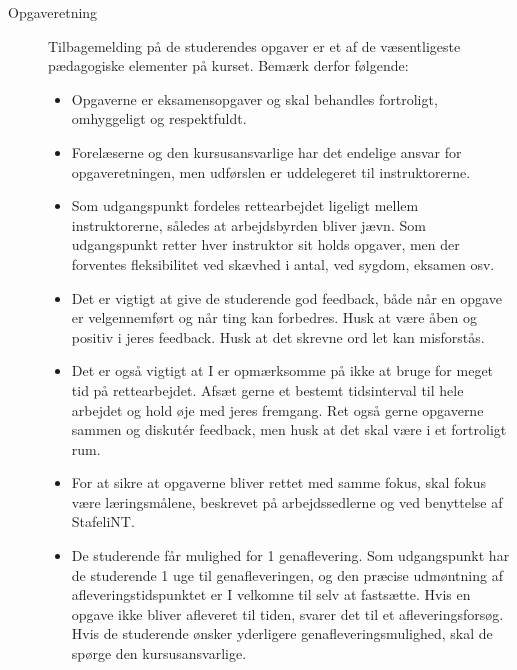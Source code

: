 \documentclass[a4paper]{article}
\begin{document}
\begin{description}
\item[Opgaveretning] Tilbagemelding på de studerendes opgaver er et
  af de væsentligeste pædagogiske elementer på kurset. Bemærk derfor
  følgende:
  \begin{itemize}
  \item Opgaverne er eksamensopgaver og skal behandles fortroligt,
    omhyggeligt og respektfuldt.
  \item Forelæserne og den kursusansvarlige har det endelige ansvar for
    opgaveretningen, men udførslen er uddelegeret til instruktorerne.
  \item Som udgangspunkt fordeles rettearbejdet ligeligt mellem
    instruktorerne, således at arbejdsbyrden bliver jævn. Som
    udgangspunkt retter hver instruktor sit holds opgaver, men der
    forventes fleksibilitet ved skævhed i antal, ved sygdom, eksamen
    osv.
  \item Det er vigtigt at give de studerende god feedback, både når en
    opgave er velgennemført og når ting kan forbedres. Husk at være
    åben og positiv i jeres feedback. Husk at det skrevne ord let kan
    misforstås.
  \item Det er også vigtigt at I er opmærksomme på ikke at bruge for
    meget tid på rettearbejdet. Afsæt gerne et bestemt tidsinterval
    til hele arbejdet og hold øje med jeres fremgang. Ret også gerne
    opgaverne sammen og diskut\'{e}r feedback, men husk at det skal være
    i et fortroligt rum.
  \item For at sikre at opgaverne bliver rettet med samme fokus, skal
    fokus være læringsmålene, beskrevet på arbejdssedlerne og ved
    benyttelse af StafeliNT.
  \item De studerende får mulighed for 1 genaflevering. Som
    udgangspunkt har de studerende 1 uge til genafleveringen, og den
    præcise udmøntning af afleveringstidspunktet er I velkomne til
    selv at fastsætte. Hvis en opgave ikke bliver afleveret til tiden,
    svarer det til et afleveringsforsøg. Hvis de studerende ønsker
    yderligere genafleveringsmulighed, skal de spørge
    den kursusansvarlige.
  \end{itemize}



\end{description}
\end{document}
